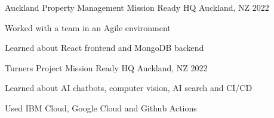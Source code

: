 

\begin{cventries}

  \cventry
    {Auckland Property Management} %
    {Mission Ready HQ} %
    {Auckland, NZ} %
    {2022} %
    {
      \begin{cvitems} %
        \item {Worked with a team in an Agile environment}
        \item {Learned about React frontend and MongoDB backend}
      \end{cvitems}
    }

  \cventry
    {Turners Project} %
    {Mission Ready HQ} %
    {Auckland, NZ} %
    {2022} %
    {
      \begin{cvitems} %
        \item {Learned about AI chatbots, computer vision, AI search and CI/CD}
        \item {Used IBM Cloud, Google Cloud and Github Actions}
      \end{cvitems}
    }


\end{cventries}
